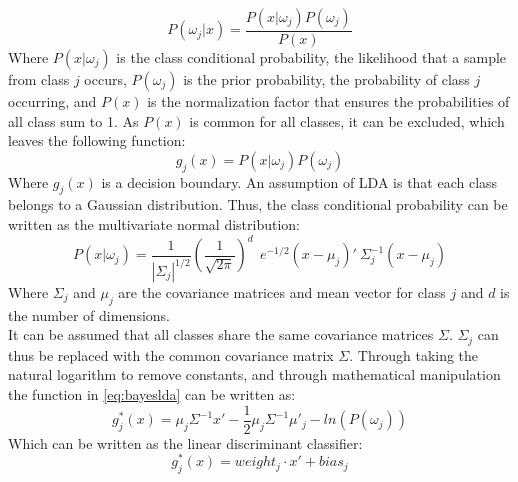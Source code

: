 \begin{equation}
	P(\omega_{j}|x) = \frac{P(x|\omega_{j})P(\omega_{j})}{P(x)}
\end{equation}
\vspace{-0.02cm}
\noindent Where $P(x|\omega_{j})$ is the class conditional probability, the likelihood that a sample from class $j$ occurs, $P(\omega_{j})$ is the prior probability, the probability of class $j$ occurring, and $P(x)$ is the normalization factor that ensures the probabilities of all class sum to 1. As $P(x)$ is common for all classes, it can be excluded, which leaves the following function:
\vspace{-0.05cm}
\begin{equation} \label{eq:bayeslda}
	g_{j}(x) = P(x|\omega_{j})P(\omega_{j})
\end{equation} 
\vspace{-0.02cm}
\noindent Where $g_{j}(x)$ is a decision boundary. An assumption of LDA is that each class belongs to a Gaussian distribution. Thus, the class conditional probability can be written as the multivariate normal distribution:
\vspace{-0.05cm}
\begin{equation}
P(x|\omega_{j}) = \frac{1}{|\varSigma_{j}|^{1/2}}(\frac{1}{\sqrt{2\pi}})^{d} ~~e^{-1/2} (x-\mu_{j})' ~\varSigma^{-1}_{j} (x-\mu_{j})
\end{equation} 
\vspace{-0.05cm}
\noindent Where $\varSigma_{j}$ and $\mu_{j}$ are the covariance matrices and mean vector for class $j$ and $d$ is the number of dimensions. \\
It can be assumed that all classes share the same covariance matrices $\varSigma$. $\varSigma_{j}$ can thus be replaced with the common covariance matrix $\varSigma$. Through taking the natural logarithm to remove constants, and through mathematical manipulation the function in \eqref{eq:bayeslda} can be written as:
\vspace{-0.05cm}
\begin{equation} 
	g_{j}^{*}(x) = \mu_{j}\varSigma^{-1}x' - \frac{1}{2}\mu_{j}\varSigma^{-1}\mu'_{j} - ln(P(\omega_{j}))
\end{equation}
\vspace{-0.01cm}
\noindent Which can be written as the linear discriminant classifier:
\vspace{-0.05cm}
\begin{equation} \label{eq:ldclassifier}
	g_{j}^{*}(x) = weight_{j}\cdot x' + bias_{j}
\end{equation}
